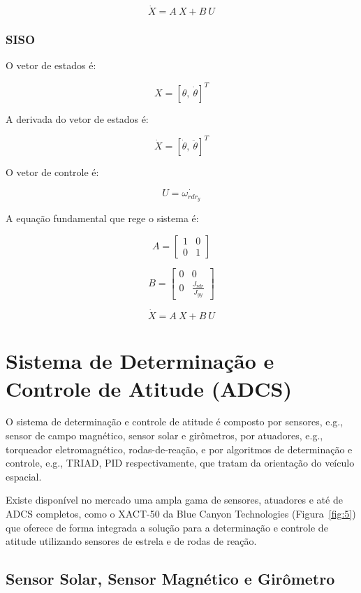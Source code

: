 $$
\dot{X} = A\:X + B\:U
$$

\subsubsection{SISO}

O vetor de estados é:

$$
X = [\theta, \: \dot{\theta}]^T
$$

A derivada do vetor de estados é:

$$
\dot{X} = [\dot{\theta}, \: \ddot{\theta}]^T
$$

O vetor de controle é:

$$
U = \dot{\omega_{rdr_y}}
$$

A equação fundamental que rege o sistema é:

$$
A = \begin{bmatrix}
	1 & 0 \\
	0 & 1
\end{bmatrix}
$$

$$
B = \begin{bmatrix}
	0 & 0 \\
	0 & \frac{J_{rdr}}{J_{yy}}
\end{bmatrix}
$$

$$
\dot{X} = A\:X + B\:U
$$



\section{Sistema de Determinação e Controle de Atitude (ADCS)}\label{sec:3.1.4}

O sistema de determinação e controle de atitude é composto por sensores, {e.g.}, sensor de campo magnético, sensor solar e girômetros, por atuadores, {e.g.}, torqueador eletromagnético, rodas-de-reação, e por algoritmos de determinação e controle, {e.g.}, TRIAD, PID respectivamente, que tratam da orientação do veículo espacial.

Existe disponível no mercado uma ampla gama de sensores, atuadores e até de ADCS completos, como o XACT-50 da Blue Canyon Technologies  (Figura~\ref{fig:5}) que oferece de forma integrada a solução para a determinação e controle de atitude utilizando sensores de estrela e de rodas de reação.

\subsection{Sensor Solar, Sensor Magnético e Girômetro}\label{sec:3.1.4.1}

